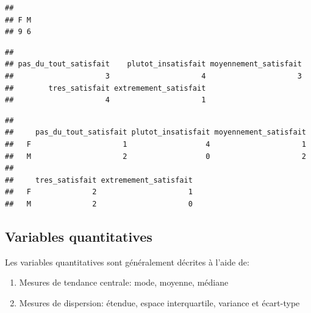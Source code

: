 \documentclass[
]{book}
\newenvironment{Shaded}{\begin{snugshade}}{\end{snugshade}}
\newcommand{\FunctionTok}[1]{\textcolor[rgb]{0.13,0.29,0.53}{\textbf{#1}}}
\newcommand{\NormalTok}[1]{#1}
\newcommand{\SpecialCharTok}[1]{\textcolor[rgb]{0.81,0.36,0.00}{\textbf{#1}}}
\providecommand{\tightlist}{%
  \setlength{\itemsep}{0pt}\setlength{\parskip}{0pt}}
\begin{document}
\begin{verbatim}
## 
## F M 
## 9 6
\end{verbatim}

\begin{Shaded}
\end{Shaded}

\begin{verbatim}
## 
## pas_du_tout_satisfait    plutot_insatisfait moyennement_satisfait 
##                     3                     4                     3 
##        tres_satisfait extremement_satisfait 
##                     4                     1
\end{verbatim}

\begin{Shaded}
\end{Shaded}

\begin{verbatim}
##    
##     pas_du_tout_satisfait plutot_insatisfait moyennement_satisfait
##   F                     1                  4                     1
##   M                     2                  0                     2
##    
##     tres_satisfait extremement_satisfait
##   F              2                     1
##   M              2                     0
\end{verbatim}

\subsection{Variables quantitatives}\label{variables-quantitatives}

Les variables quantitatives sont généralement décrites à l'aide de:

\begin{enumerate}
\def\labelenumi{\arabic{enumi}.}
\tightlist
\item
  Mesures de tendance centrale: mode, moyenne, médiane
\item
  Mesures de dispersion: étendue, espace interquartile, variance et écart-type
\end{enumerate}
\end{document}
